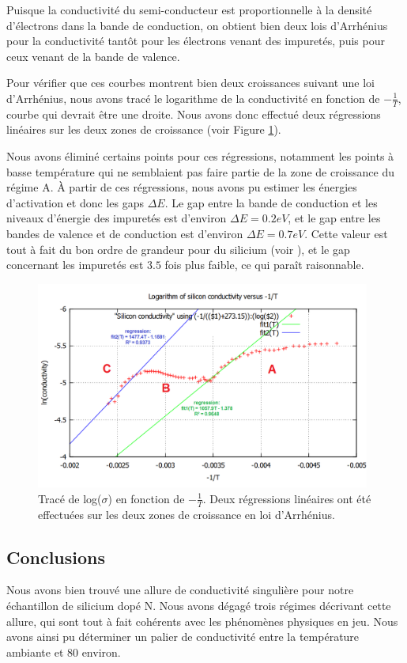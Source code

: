 Puisque la conductivité du semi-conducteur est proportionnelle à la densité d'électrons dans la bande de conduction, on obtient bien deux lois d'Arrhénius pour la conductivité tantôt pour les électrons venant des impuretés, puis pour ceux venant de la bande de valence.

Pour vérifier que ces courbes montrent bien deux croissances suivant une loi d'Arrhénius, nous avons tracé le logarithme de la conductivité en fonction de $-\frac{1}{T}$, courbe qui devrait être une droite. Nous avons donc effectué deux régressions linéaires sur les deux zones de croissance (voir Figure \ref{log}).

Nous avons éliminé certains points pour ces régressions, notamment les points à basse température qui ne semblaient pas faire partie de la zone de croissance du régime A. À partir de ces régressions, nous avons pu estimer les énergies d'activation et donc les gaps $\Delta E$. Le gap entre la bande de conduction et les niveaux d'énergie des impuretés est d'environ $\Delta E = 0.2 eV$, et le gap entre les bandes de valence et de conduction est d'environ $\Delta E = 0.7 eV$. Cette valeur est tout à fait du bon ordre de grandeur pour du silicium (voir \cite{kittel_introduction_1976}), et le gap concernant les impuretés est $3.5$ fois plus faible, ce qui paraît raisonnable.

\begin{figure}[ht]
  \begin{center}
		\includegraphics[width=11cm]{./images/Fit_de_log(sigma)_versus_-inverse(T).png}
		\caption{Tracé de log($\sigma$) en fonction de $-\frac{1}{T}$. Deux régressions linéaires ont été effectuées sur les deux zones de croissance en loi d'Arrhénius.}
		\label{log}
	\end{center}
\end{figure}

\subsection{Conclusions}
Nous avons bien trouvé une allure de conductivité singulière pour notre échantillon de silicium dopé N. Nous avons dégagé trois régimes décrivant cette allure, qui sont tout à fait cohérents avec les phénomènes physiques en jeu. Nous avons ainsi pu déterminer un palier de conductivité entre la température ambiante et 80 \celsius{} environ.
